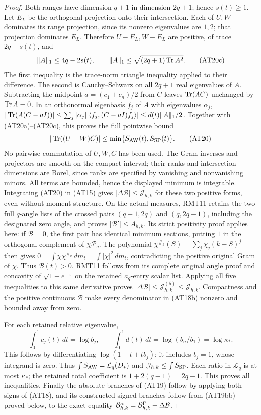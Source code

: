 \begin{proof}
Both ranges have dimension $q+1$ in dimension $2q+1$; hence
$s(t)\ge1$. Let $E_L$ be the orthogonal projection onto their
intersection. Each of $U,W$ dominates its range projection, since
its nonzero eigenvalues are $1,2$; that projection dominates $E_L$.
Therefore $U-E_L,W-E_L$ are positive, of trace $2q-s(t)$, and
\[
 \|A\|_1\le4q-2s(t),\qquad
 \|A\|_1\le\sqrt{(2q+1)\operatorname{Tr} A^2}.
 \tag{AT20c}
\]
The first inequality is the trace-norm triangle inequality applied
to their difference. The second is Cauchy--Schwarz on all $2q+1$
real eigenvalues of $A$. Subtracting the midpoint
$a=(c_1+c_n)/2$ from $C$ leaves $\operatorname{Tr}(AC)$ unchanged by $\operatorname{Tr} A=0$.
In an orthonormal eigenbasis $f_j$ of $A$ with eigenvalues $\alpha_j$,
$|\operatorname{Tr}(A(C-aI))|\le\sum_j|\alpha_j|
|\langle f_j,(C-aI)f_j\rangle|\le d(t)\|A\|_1/2$.
Together with (AT20a)--(AT20c), this proves the full pointwise bound
\[
 |\operatorname{Tr}((U-W)C)|\le\min\{S_{\rm AW}(t),S_{\rm SP}(t)\}.
 \tag{AT20}
\]
No pairwise commutation of $U,W,C$ has been used.
The Gram inverses and projectors are smooth on the compact
interval; their ranks and intersection dimensions are Borel,
since ranks are specified by vanishing and nonvanishing minors.
All terms are bounded, hence the displayed minimum is integrable.
Integrating (AT20) in (AT15) gives
$|\Delta\mathcal B|\le\mathcal J_{h,k}$ for these two positive
forms, even without moment structure. On the actual measures,
RMT11 retains the two full $q$-angle lists of the crossed pairs
$(q-1,2q)$ and $(q,2q-1)$, including the designated zero angle,
and proves $|\mathcal B'|\le A_{h,k}$.
Its strict positivity proof applies here: if $\mathcal B=0$,
the first pair has identical minimum sections, putting $1$ in
the orthogonal complement of $\chi\mathcal P_q$. The polynomial
$\chi^{\#_k}(S)=\sum_j\overline{\chi_j}(k-S)^j$ then gives
$0=\int\chi\chi^{\#_k}\,dm_t=\int|\chi|^2\,dm_t$, contradicting
the positive original Gram of $\chi$. Thus $\mathcal B(t)>0$.
RMT11 follows from its complete original angle proof and concavity
of $\sqrt{1-e^{-z}}$ on the retained $a_q$-entry scalar list.
Applying all five inequalities to this same derivative proves
$|\Delta\mathcal B|\le\mathcal J_{h,k}^{(5)}\le\mathcal J_{h,k}$.
Compactness and the positive continuous $\mathcal B$ make every
denominator in (AT18b) nonzero and bounded away from zero.

For each retained relative eigenvalue,
\[
 \int_0^1 c_j(t)\,dt=\log b_j,\qquad
 \int_0^1d(t)\,dt=\log(b_n/b_1)=\log\kappa_*.
 \tag{AT21}
\]
This follows by differentiating $\log(1-t+tb_j)$; it includes
$b_j=1$, whose integrand is zero. Thus
$\int S_{\rm AW}=\mathcal L_q(D_*)$ and
$\mathcal J_{h,k}\le\int S_{\rm SP}$. Each ratio in
$\mathcal L_q$ is at most $\kappa_*$; the retained total
coefficient is $1+2(q-1)=2q-1$. This proves all inequalities.
Finally the absolute branches of (AT19) follow by applying both signs
of (AT18), and its constructed signed branches follow from (AT19bb)
proved below, to the exact equality
$\mathcal B^{\mathrm{ar}}_{h,k}=\mathcal B^\Gamma_{h,k}+\Delta\mathcal B$.
\end{proof}



